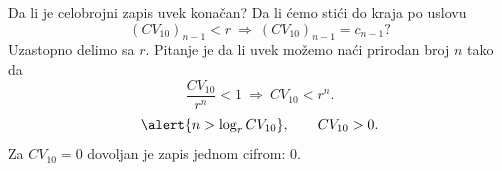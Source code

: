\begin{frame}[label=04-s009]{Da li je celobrojni zapis uvek konačan?}
Da li ćemo stići do kraja po uslovu
\[(CV_{10})_{n-1}<r\ \Rightarrow\ (CV_{10})_{n-1}=c_{n-1}?\]
Uzastopno delimo sa $r$. Pitanje je da li uvek možemo naći prirodan broj $n$ tako da
\[\frac{CV_{10}}{r^n}<1\ \Rightarrow\ CV_{10}<r^n.\]
\[\alert{n>\log_r CV_{10}},\qquad CV_{10}>0.\]
Za $CV_{10}=0$ dovoljan je zapis jednom cifrom: $0$.
\end{frame}
